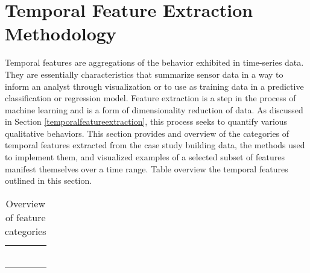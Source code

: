 \section{Temporal Feature Extraction Methodology}
\label{sec:featureextraction}

Temporal features are aggregations of the behavior exhibited in time-series data. They are essentially characteristics that summarize sensor data in a way to inform an analyst through visualization or to use as training data in a predictive classification or regression model. Feature extraction is a step in the process of machine learning and is a form of dimensionality reduction of data. As discussed in Section \ref{temporalfeatureextraction}, this process seeks to quantify various qualitative behaviors. This section provides and overview of the categories of temporal features extracted from the case study building data, the methods used to implement them, and visualized examples of a selected subset of features manifest themselves over a time range. Table  overview the temporal features outlined in this section.

\begin{table} 
    \begin{tabular}{ c c }
         &  \\ 
         &  \\ 
         &  \\ 
         &  \\ 
         &  \\ 
         &  \\ 
    \end{tabular} 
    \caption{Overview of feature categories}
\end{table}
